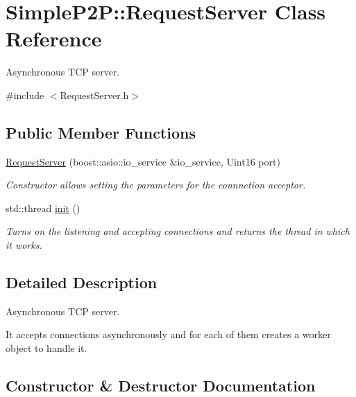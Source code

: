 \hypertarget{classSimpleP2P_1_1RequestServer}{}\section{Simple\+P2P\+:\+:Request\+Server Class Reference}
\label{classSimpleP2P_1_1RequestServer}


Asynchronous T\+CP server.  




{\ttfamily \#include $<$Request\+Server.\+h$>$}

\subsection*{Public Member Functions}
\begin{DoxyCompactItemize}
\item 
\hyperlink{classSimpleP2P_1_1RequestServer_adfd41a4161009a119b523e731a21d85d}{Request\+Server} (boost\+::asio\+::io\+\_\+service \&io\+\_\+service, Uint16 port)
\begin{DoxyCompactList}\small\item\em Constructor allows setting the parameters for the connnetion acceptor. \end{DoxyCompactList}\item 
\mbox{\label{classSimpleP2P_1_1RequestServer_afe2b69eb9717c03f083a6060f83570d3}} 
std\+::thread \hyperlink{classSimpleP2P_1_1RequestServer_afe2b69eb9717c03f083a6060f83570d3}{init} ()
\begin{DoxyCompactList}\small\item\em Turns on the listening and accepting connections and returns the thread in which it works. \end{DoxyCompactList}\end{DoxyCompactItemize}


\subsection{Detailed Description}
Asynchronous T\+CP server. 

It accepts connections asynchronously and for each of them creates a worker object to handle it. 

\subsection{Constructor \& Destructor Documentation}
\mbox{\label{classSimpleP2P_1_1RequestServer_adfd41a4161009a119b523e731a21d85d}} 
